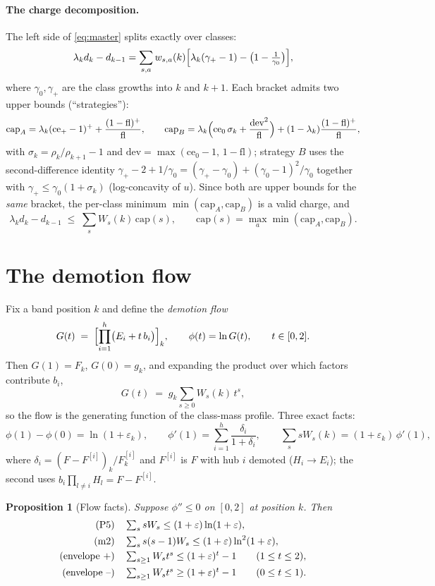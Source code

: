 \documentclass[11pt]{article}
\newtheorem{proposition}[theorem]{Proposition}
\theoremstyle{definition}
\newcommand{\eps}{\varepsilon}
\begin{document}
\paragraph{The charge decomposition.}
The left side of \eqref{eq:master} splits exactly over classes:
\[
  \lambda_kd_k-d_{k-1}
  =\sum_{s,a}w_{s,a}(k)\Bigl[\lambda_k(\gamma_+-1)-\bigl(1-\tfrac1{\gamma_0}\bigr)\Bigr],
\]
where $\gamma_0,\gamma_+$ are the class growths into $k$ and $k+1$.
Each bracket admits two upper bounds (``strategies''):
\[
  \mathrm{cap}_A=\lambda_k(\mathrm{ce}_+-1)^++\frac{(1-\mathrm{fl})^+}{\mathrm{fl}},
  \qquad
  \mathrm{cap}_B=\lambda_k\Bigl(\mathrm{ce}_0\,\sigma_k
  +\frac{\mathrm{dev}^2}{\mathrm{fl}}\Bigr)
  +(1-\lambda_k)\frac{(1-\mathrm{fl})^+}{\mathrm{fl}},
\]
with $\sigma_k=\rho_k/\rho_{k+1}-1$ and
$\mathrm{dev}=\max(\mathrm{ce}_0-1,\,1-\mathrm{fl})$; strategy $B$
uses the second-difference identity
$\gamma_+-2+1/\gamma_0=(\gamma_+-\gamma_0)+(\gamma_0-1)^2/\gamma_0$
together with $\gamma_+\le\gamma_0(1+\sigma_k)$ (log-concavity of $u$).
Since both are upper bounds for the \emph{same} bracket, the
per-class minimum $\min(\mathrm{cap}_A,\mathrm{cap}_B)$ is a valid
charge, and
\begin{equation}\label{eq:charges}
  \lambda_kd_k-d_{k-1}\;\le\;\sum_sW_s(k)\,\mathrm{cap}(s),\qquad
  \mathrm{cap}(s)=\max_a\min(\mathrm{cap}_A,\mathrm{cap}_B).
\end{equation}

\section{The demotion flow}\label{sec:flow}

Fix a band position $k$ and define the \emph{demotion flow}
\[
  G(t)\;=\;\Bigl[\prod_{i=1}^h\bigl(E_i+t\,b_i\bigr)\Bigr]_k,
  \qquad \phi(t)=\ln G(t),\qquad t\in[0,2].
\]
Then $G(1)=F_k$, $G(0)=g_k$, and expanding the product over which
factors contribute $b_i$,
\[
  G(t)\;=\;g_k\sum_{s\ge0}W_s(k)\,t^s ,
\]
so the flow is the generating function of the class-mass profile.
Three exact facts:
\[
  \phi(1)-\phi(0)=\ln(1+\eps_k),\qquad
  \phi'(1)=\sum_{i=1}^h\frac{\delta_i}{1+\delta_i},\qquad
  \sum_s sW_s(k)=(1+\eps_k)\,\phi'(1),
\]
where $\delta_i=(F-F^{[i]})_k/F^{[i]}_k$ and $F^{[i]}$ is $F$ with hub
$i$ demoted ($H_i\to E_i$); the second uses
$b_i\prod_{l\ne i}H_l=F-F^{[i]}$.

\begin{proposition}[Flow facts]\label{prop:flow}
Suppose $\phi''\le0$ on $[0,2]$ at position $k$.  Then
\begin{align*}
  \textup{(P5)}\quad &\textstyle\sum_s sW_s\le(1+\eps)\ln(1+\eps),\\
  \textup{(m2)}\quad &\textstyle\sum_s s(s-1)W_s\le(1+\eps)\ln^2(1+\eps),\\
  \textup{(envelope +)}\quad
  &\textstyle\sum_{s\ge1}W_st^s\le(1+\eps)^t-1\qquad(1\le t\le2),\\
  \textup{(envelope --)}\quad
  &\textstyle\sum_{s\ge1}W_st^s\ge(1+\eps)^t-1\qquad(0\le t\le1).
\end{align*}
\end{proposition}
\end{document}
